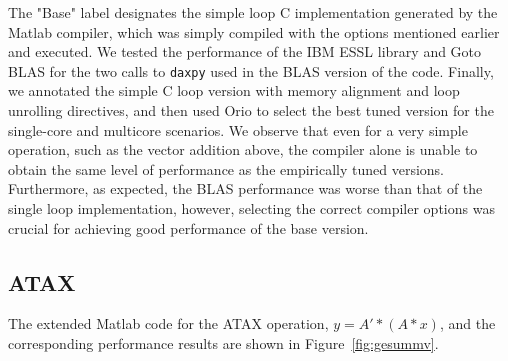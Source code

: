\documentclass[11pt]{article}
\begin{document}
The "Base" label designates the simple loop C implementation generated by the Matlab compiler, which was simply compiled with the options mentioned earlier and executed. We tested the performance of the IBM ESSL library and Goto BLAS for the two calls to \texttt{daxpy} used in the BLAS version of the code. Finally, we annotated the simple C loop version with memory alignment and loop unrolling directives, and then used Orio to select the best tuned version for the single-core and multicore scenarios. We observe that even for a very simple operation, such as the vector addition above, the compiler alone is unable to obtain the same level of performance as the empirically tuned versions. Furthermore, as expected, the BLAS performance was worse than that of the single loop implementation, however, selecting the correct compiler options was crucial for achieving good performance of the base version.

\subsection{ATAX}


The extended Matlab code for the ATAX operation, $y = A' * (A * x)$,
and the corresponding performance results are shown in Figure~\ref{fig:gesummv}.
\end{document}
